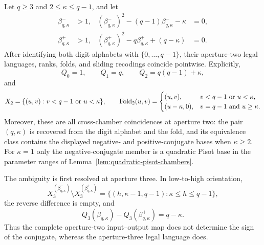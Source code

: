 \begin{theorem}
\label{thm:quadratic-aperture-two-duality}
Let $q\ge3$ and $2\le\kappa\le q-1$, and let
\begin{align*}
\beta^-_{q,\kappa}&>1,
& (\beta^-_{q,\kappa})^2-(q-1)\beta^-_{q,\kappa}-\kappa&=0,\\
\beta^+_{q,\kappa}&>1,
& (\beta^+_{q,\kappa})^2-q\beta^+_{q,\kappa}+(q-\kappa)&=0.
\end{align*}
After identifying both digit alphabets with $\{0,\ldots,q-1\}$, their
aperture-two legal languages, ranks, folds, and sliding recodings coincide
pointwise.  Explicitly,
\[
Q_0=1,\qquad Q_1=q,\qquad Q_2=q(q-1)+\kappa,
\]
and
\[
X_2=\{(u,v):v<q-1\ \hbox{or}\ u<\kappa\},
\qquad
\Fold_2(u,v)=
\begin{cases}
(u,v),&v<q-1\ \hbox{or}\ u<\kappa,\\
(u-\kappa,0),&v=q-1\ \hbox{and}\ u\ge\kappa.
\end{cases}
\]
Moreover, these are all cross-chamber coincidences at aperture two: the pair
$(q,\kappa)$ is recovered from the digit alphabet and the fold, and its
equivalence class contains the displayed negative- and positive-conjugate
bases when $\kappa\ge2$.  For $\kappa=1$ only the negative-conjugate member
is a quadratic Pisot base in the parameter ranges of
Lemma~\ref{lem:quadratic-pisot-chambers}.

The ambiguity is first resolved at aperture three.  In low-to-high
orientation,
\[
X_3^{(\beta^-_{q,\kappa})}
 \setminus X_3^{(\beta^+_{q,\kappa})}
=\{(h,\kappa-1,q-1):\kappa\le h\le q-1\},
\]
the reverse difference is empty, and
\[
Q_3(\beta^-_{q,\kappa})-Q_3(\beta^+_{q,\kappa})=q-\kappa.
\]
Thus the complete aperture-two input--output map does not determine the sign
of the conjugate, whereas the aperture-three legal language does.
\end{theorem}

